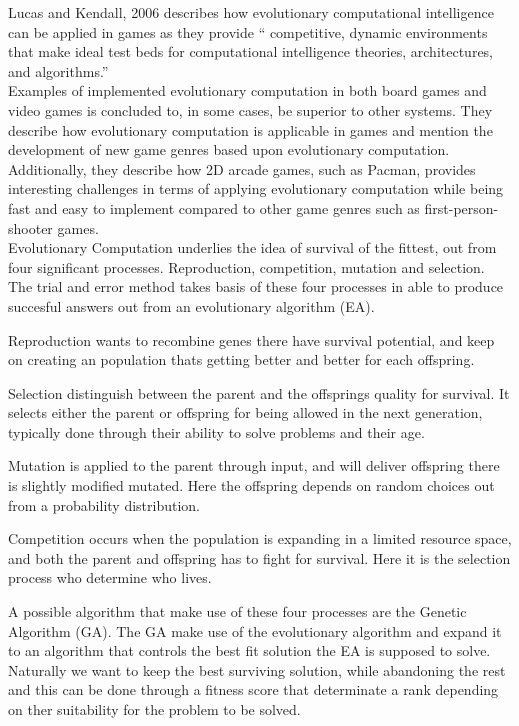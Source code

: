 Lucas and Kendall, 2006 \cite{Lucas2006} describes how evolutionary computational intelligence can be applied in games as they provide  \enquote{ competitive, dynamic
environments that make ideal test beds
for computational intelligence theories,
architectures, and algorithms.}\cite[pp. 10]{Lucas2006}\\
Examples of implemented evolutionary computation in both board games and video games is concluded to, in some cases, be superior to other systems. They describe how evolutionary computation is applicable in games and mention the development of new game genres based upon evolutionary computation. Additionally, they describe how 2D arcade games, such as Pacman, provides interesting challenges in terms of applying evolutionary computation while being fast and easy to implement compared to other game genres such as first-person-shooter games.\cite[pp 15]{Lucas2006}\\

Evolutionary Computation underlies the idea of survival of the fittest, out from four significant processes.
Reproduction, competition, mutation and selection. \cite{Fogel1997} The trial and error method takes basis of these four processes in able to produce succesful answers out from an evolutionary algorithm (EA).


Reproduction wants to recombine  genes there have survival potential, and keep on creating an population thats getting better and better for each offspring. \cite{Fogel1997}

Selection distinguish between the parent and the offsprings quality for survival. It selects either the parent or offspring for being allowed in the next generation, typically done through their ability to solve problems and their age.   \cite{Smith2007}

Mutation is applied to the parent through input, and will deliver offspring there is slightly modified mutated. Here the offspring depends on random choices out from a probability distribution.  \cite{Smith2007}


Competition occurs when the population is expanding in a limited resource space, and both the parent and offspring has to fight for survival. Here it is the selection process who determine who lives. \cite{Fogel1997}



A possible algorithm that make use of these four processes are the Genetic Algorithm (GA). The GA make use of the evolutionary algorithm and expand it to an algorithm that controls the best fit solution the EA is supposed to solve. Naturally we want to keep the best surviving solution, while abandoning the rest and this can be done through a fitness score that determinate a rank depending on ther suitability for the problem to be solved. \cite {Sivanandam2008}


